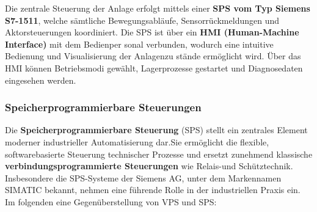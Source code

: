Die zentrale Steuerung der Anlage erfolgt mittels einer \textbf{SPS vom Typ Siemens S7-1511},
welche sämtliche Bewegungsabläufe, Sensorrückmeldungen und Aktorsteuerungen
koordiniert. Die SPS ist über ein \textbf{HMI (Human-Machine Interface)} mit dem Bedienper
sonal verbunden, wodurch eine intuitive Bedienung und Visualisierung der Anlagenzu
stände ermöglicht wird. Über das HMI können Betriebsmodi gewählt, Lagerprozesse
gestartet und Diagnosedaten eingesehen werden.




\subsubsection{Speicherprogrammierbare Steuerungen}
Die \textbf{Speicherprogrammierbare Steuerung} (SPS) stellt ein zentrales Element moderner
industrieller Automatisierung dar.Sie ermöglicht die flexible, softwarebasierte Steuerung
technischer Prozesse und ersetzt zunehmend klassische \textbf{verbindungsprogrammierte
Steuerungen} wie Relais-und Schütztechnik. Insbesondere die SPS-Systeme der
Siemens AG, unter dem Markennamen SIMATIC bekannt, nehmen eine führende Rolle
in der industriellen Praxis ein.
Im folgenden eine Gegenüberstellung von VPS und SPS:


